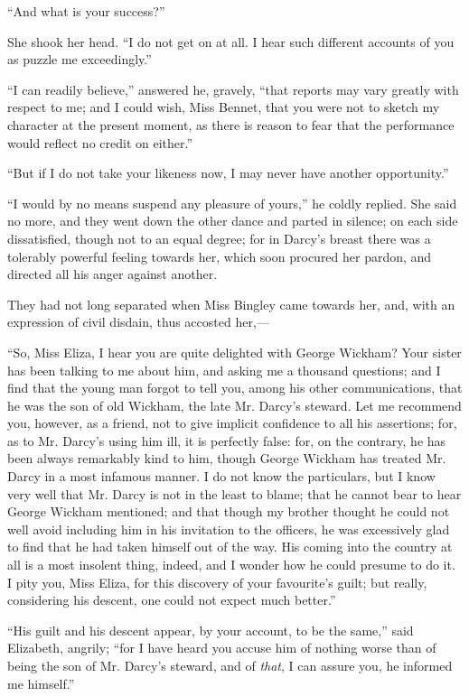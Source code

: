 \documentclass[12pt,openright]{book}
\begin{document}
“And what is your success?”

She shook her head. “I do not get on at all. I hear such different accounts of you as puzzle me exceedingly.”

“I can readily believe,” answered he, gravely, “that reports may vary greatly with respect to me; and I could wish, Miss Bennet, that you were not to sketch my character at the present moment, as there is reason to fear that the performance would reflect no credit on either.”

“But if I do not take your likeness now, I may never have another opportunity.”

“I would by no means suspend any pleasure of yours,” he coldly replied. She said no more, and they went down the other dance and parted in silence; on each side dissatisfied, though not to an equal degree; for in Darcy’s breast there was a tolerably powerful feeling towards her, which soon procured her pardon, and directed all his anger against another.

They had not long separated when Miss Bingley came towards her, and, with an expression of civil disdain, thus accosted her,—

“So, Miss Eliza, I hear you are quite delighted with George Wickham? Your sister has been talking to me about him, and asking me a thousand questions; and I find that the young man forgot to tell you, among his other communications, that he was the son of old Wickham, the late Mr. Darcy’s steward. Let me recommend you, however, as a friend, not to give implicit confidence to all his assertions; for, as to Mr. Darcy’s using him ill, it is perfectly false: for, on the contrary, he has been always remarkably kind to him, though George Wickham has treated Mr. Darcy in a most infamous manner. I do not know the particulars, but I know very well that Mr. Darcy is not in the least to blame; that he cannot bear to hear George Wickham mentioned; and that though my brother thought he could not well avoid including him in his invitation to the officers, he was excessively glad to find that he had taken himself out of the way. His coming into the country at all is a most insolent thing, indeed, and I wonder how he could presume to do it. I pity you, Miss Eliza, for this discovery of your favourite’s guilt; but really, considering his descent, one could not expect much better.”

“His guilt and his descent appear, by your account, to be the same,” said Elizabeth, angrily; “for I have heard you accuse him of nothing worse than of being the son of Mr. Darcy’s steward, and of \textit{that}, I can assure you, he informed me himself.”
\end{document}
